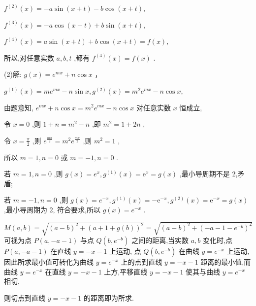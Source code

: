 \documentclass[10pt]{article}
\begin{document}
\({f}^{\left( 2\right) }\left( x\right)  =  - a\sin \left( {x + t}\right)  - b\cos \left( {x + t}\right) ,\)

\({f}^{\left( 3\right) }\left( x\right)  =  - a\cos \left( {x + t}\right)  + b\sin \left( {x + t}\right) ,\)

\({f}^{\left( 4\right) }\left( x\right)  = a\sin \left( {x + t}\right)  + b\cos \left( {x + t}\right)  = f\left( x\right) ,\)

所以,对任意实数 \(a,b,t\) ,都有 \({f}^{\left( 4\right) }\left( x\right)  = f\left( x\right)\) .

(2)解: \(g\left( x\right)  = {e}^{mx} + n\cos x\) ，

\({g}^{\left( 1\right) }\left( x\right)  = m{e}^{mx} - n\sin x,{g}^{\left( 2\right) }\left( x\right)  = {m}^{2}{e}^{mx} - n\cos x,\)

由题意知, \({e}^{mx} + n\cos x = {m}^{2}{e}^{mx} - n\cos x\) 对任意实数 \(x\) 恒成立,

令 \(x = 0\) ,则 \(1 + n = {m}^{2} - n\) ,即 \({m}^{2} = 1 + {2n}\) ,

令 \(x = \frac{\pi }{2}\) ,则 \({e}^{\frac{m\pi }{2}} = {m}^{2}{e}^{\frac{m\pi }{2}}\) ,则 \({m}^{2} = 1\) ,

所以 \(m = 1,n = 0\) 或 \(m =  - 1,n = 0\) .

若 \(m = 1,n = 0\) ,则 \(g\left( x\right)  = {e}^{x},{g}^{\left( 1\right) }\left( x\right)  = {\mathrm{e}}^{x} = g\left( x\right)\) ,最小导周期不是 2,矛盾;

若 \(m =  - 1,n = 0\) ,则 \(g\left( x\right)  = {e}^{-x},{g}^{\left( 1\right) }\left( x\right)  =  - {\mathrm{e}}^{-x},{g}^{\left( 2\right) }\left( x\right)  = {\mathrm{e}}^{-x} = g\left( x\right)\) ,最小导周期为 2, 符合要求,所以 \(g\left( x\right)  = {e}^{-x}\) .

\(M\left( {a,b}\right)  = \sqrt{{\left( a - b\right) }^{2} + {\left( a + 1 + g\left( b\right) \right) }^{2}} = \sqrt{{\left( a - b\right) }^{2} + {\left( -a - 1 - {e}^{-b}\right) }^{2}}\) 可视为点 \(P\left( {a, - a - 1}\right)\) 与点 \(Q\left( {b,{e}^{-b}}\right)\) 之间的距离,当实数 \(a,b\) 变化时,点 \(P\left( {a, - a - 1}\right)\) 在直线 \(y =  - x - 1\) 上运动, 点 \(Q\left( {b,{e}^{-b}}\right)\) 在曲线 \(y = {e}^{-x}\) 上运动,因此所求最小值可转化为曲线 \(y = {e}^{-x}\) 上的点到直线 \(y =  - x - 1\) 距离的最小值,而曲线 \(y = {e}^{-x}\) 在直线 \(y =  - x - 1\) 上方,平移直线 \(y =  - x - 1\) 使其与曲线 \(y = {e}^{-x}\) 相切,

则切点到直线 \(y =  - x - 1\) 的距离即为所求.
\end{document}
